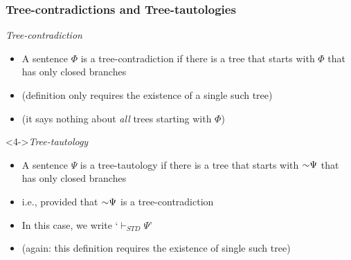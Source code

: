\begin{frame}
\frametitle{Tree-contradictions and Tree-tautologies}

 \begin{block}{\emph{Tree-contradiction}}
    \begin{itemize}[<+->]
      \item A sentence $\Phi$ is a tree-contradiction if there is a tree that starts with $\Phi$ that has only closed branches

  \item (definition only requires the existence of a single such tree)

  \item (it says nothing about \textit{all} trees starting with $\Phi$)
\end{itemize} 
\end{block}

\begin{block}<4->{\emph{Tree-tautology}}
    \begin{itemize}[<+->]
      \item A sentence $\Psi$ is a tree-tautology if there is a tree that starts with $\enot \Psi$ that has only closed branches

\item i.e., provided that $\enot \Psi$ is a tree-contradiction

\item In this case, we write `$\vdash_{STD} \Psi$'

  \item (again: this definition requires the existence of single such tree)

\end{itemize} 
\end{block}





\end{frame}

